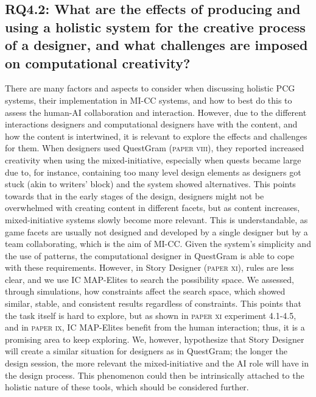 





\subsection[Research Question 4.2]{RQ4.2: What are the effects of producing and using a holistic system for the creative process of a designer, and what challenges are imposed on computational creativity?}

There are many factors and aspects to consider when discussing holistic PCG systems, their implementation in MI-CC systems, and how to best do this to assess the human-AI collaboration and interaction. However, due to the different interactions designers and computational designers have with the content, and how the content is intertwined, it is relevant to explore the effects and challenges for them. When designers used QuestGram (\textsc{paper viii}), they reported increased creativity when using the mixed-initiative, especially when quests became large due to, for instance, containing too many level design elements as designers got stuck (akin to writers' block) and the system showed alternatives. This points towards that in the early stages of the design, designers might not be overwhelmed with creating content in different facets, but as content increases, mixed-initiative systems slowly become more relevant. This is understandable, as game facets are usually not designed and developed by a single designer but by a team collaborating, which is the aim of MI-CC. Given the system's simplicity and the use of patterns, the computational designer in QuestGram is able to cope with these requirements. However, in Story Designer (\textsc{paper xi}), rules are less clear, and we use IC MAP-Elites to search the possibility space. We assessed, through simulations, how constraints affect the search space, which showed similar, stable, and consistent results regardless of constraints. This points that the task itself is hard to explore, but as shown in \textsc{paper xi} experiment 4.1-4.5, and in \textsc{paper ix}, IC MAP-Elites benefit from the human interaction; thus, it is a promising area to keep exploring. We, however, hypothesize that Story Designer will create a similar situation for designers as in QuestGram; the longer the design session, the more relevant the mixed-initiative and the AI role will have in the design process. This phenomenon could then be intrinsically attached to the holistic nature of these tools, which should be considered further.

